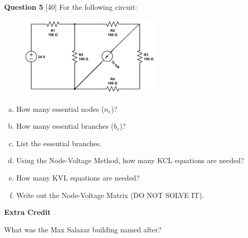 \documentclass[12pt]{article}
\begin{document}
{\bf Question 5} [40]
\newline
For the following circuit:

\begin{figure}[h!]
\centering 
\includegraphics[clip,width=0.6\textwidth]{mid1_5.jpg}
\end{figure}



\begin{enumerate}[(a)]
\item How many essential nodes ($n_e$)?
\item How many essential branches ($b_e$)?
\item List the essential branches.
\item Using the Node-Voltage Method, how many KCL equations are needed?
\item How many KVL equations are needed?
\item Write out the Node-Voltage Matrix (DO NOT SOLVE IT).

\end{enumerate}

{\bf Extra Credit}

What was the Max Salazar building named after?
\end{document}
